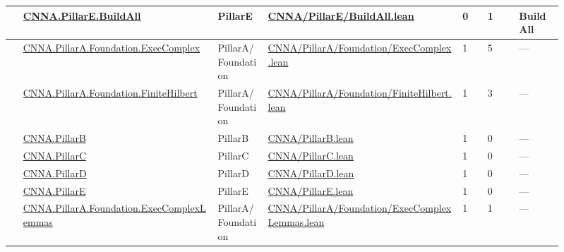 \begin{longtable}{L{0.025\linewidth} L{0.315\linewidth} L{0.08\linewidth} L{0.315\linewidth} L{0.045\linewidth} L{0.055\linewidth} L{0.07\linewidth}}
\hline
{} & \href{run:repo_snapshot/CNNA/PillarE/BuildAll.lean}{CNNA.\allowbreak{}PillarE.\allowbreak{}BuildAll} & PillarE & \href{run:repo_snapshot/CNNA/PillarE/BuildAll.lean}{CNNA/\allowbreak{}PillarE/\allowbreak{}BuildAll.\allowbreak{}lean} & 0 & 1 & BuildAll\\
\hline
{} & \href{run:repo_snapshot/CNNA/PillarA/Foundation/ExecComplex.lean}{CNNA.\allowbreak{}PillarA.\allowbreak{}Foundation.\allowbreak{}ExecComplex} & PillarA/\allowbreak{}Foundation & \href{run:repo_snapshot/CNNA/PillarA/Foundation/ExecComplex.lean}{CNNA/\allowbreak{}PillarA/\allowbreak{}Foundation/\allowbreak{}ExecComplex.\allowbreak{}lean} & 1 & 5 & ---\\
\hline
{} & \href{run:repo_snapshot/CNNA/PillarA/Foundation/FiniteHilbert.lean}{CNNA.\allowbreak{}PillarA.\allowbreak{}Foundation.\allowbreak{}FiniteHilbert} & PillarA/\allowbreak{}Foundation & \href{run:repo_snapshot/CNNA/PillarA/Foundation/FiniteHilbert.lean}{CNNA/\allowbreak{}PillarA/\allowbreak{}Foundation/\allowbreak{}FiniteHilbert.\allowbreak{}lean} & 1 & 3 & ---\\
\hline
{} & \href{run:repo_snapshot/CNNA/PillarB.lean}{CNNA.\allowbreak{}PillarB} & PillarB & \href{run:repo_snapshot/CNNA/PillarB.lean}{CNNA/\allowbreak{}PillarB.\allowbreak{}lean} & 1 & 0 & ---\\
\hline
{} & \href{run:repo_snapshot/CNNA/PillarC.lean}{CNNA.\allowbreak{}PillarC} & PillarC & \href{run:repo_snapshot/CNNA/PillarC.lean}{CNNA/\allowbreak{}PillarC.\allowbreak{}lean} & 1 & 0 & ---\\
\hline
{} & \href{run:repo_snapshot/CNNA/PillarD.lean}{CNNA.\allowbreak{}PillarD} & PillarD & \href{run:repo_snapshot/CNNA/PillarD.lean}{CNNA/\allowbreak{}PillarD.\allowbreak{}lean} & 1 & 0 & ---\\
\hline
{} & \href{run:repo_snapshot/CNNA/PillarE.lean}{CNNA.\allowbreak{}PillarE} & PillarE & \href{run:repo_snapshot/CNNA/PillarE.lean}{CNNA/\allowbreak{}PillarE.\allowbreak{}lean} & 1 & 0 & ---\\
\hline
{} & \href{run:repo_snapshot/CNNA/PillarA/Foundation/ExecComplexLemmas.lean}{CNNA.\allowbreak{}PillarA.\allowbreak{}Foundation.\allowbreak{}ExecComplexLemmas} & PillarA/\allowbreak{}Foundation & \href{run:repo_snapshot/CNNA/PillarA/Foundation/ExecComplexLemmas.lean}{CNNA/\allowbreak{}PillarA/\allowbreak{}Foundation/\allowbreak{}ExecComplexLemmas.\allowbreak{}lean} & 1 & 1 & ---\\

\end{longtable}
